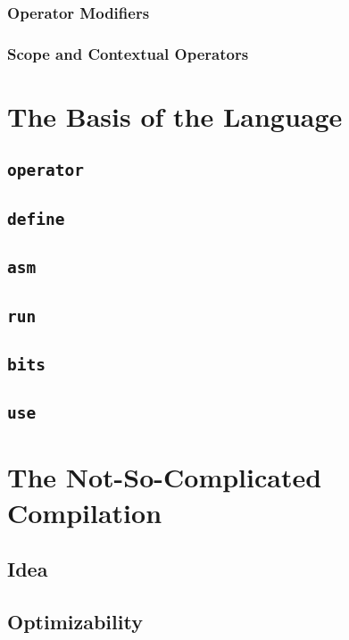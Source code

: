 \documentclass{article}
\newcommand{\secl}[1]{\section{#1}\label{sec:#1}}
\newcommand{\ssecl}[1]{\subsection{#1}\label{ssec:#1}}
\newcommand{\sssecl}[1]{\subsubsection{#1}\label{sssec:#1}}
\begin{document}
\sssecl{Operator Modifiers}

\sssecl{Scope and Contextual Operators}

\secl{The Basis of the Language}
\ssecl{\texttt{\textbf{operator}}}

\ssecl{\texttt{\textbf{define}}}

\ssecl{\texttt{\textbf{asm}}}

\ssecl{\texttt{\textbf{run}}}

\ssecl{\texttt{\textbf{bits}}}

\ssecl{\texttt{\textbf{use}}}

\secl{The Not-So-Complicated Compilation}
\ssecl{Idea}

\ssecl{Optimizability}
\end{document}
